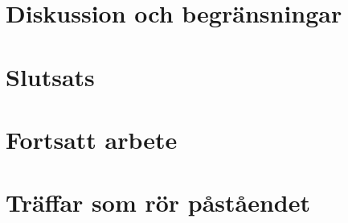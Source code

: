 \section{Diskussion och begränsningar}
\label{sec:claim-diskussion}

\section{Slutsats}
\label{sec:claim-slutsats}

\section{Fortsatt arbete}
\label{sec:claim-fortsatt}

\section{Träffar som rör påståendet}
\label{sec:claim-traffar}

